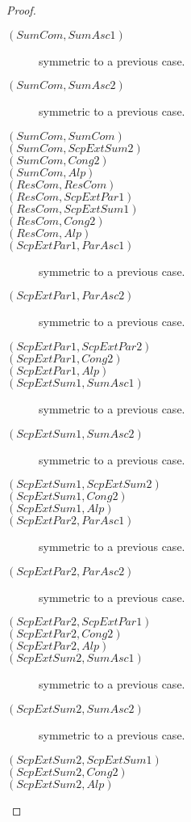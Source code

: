 \begin{lemma}
\begin{proof}
\begin{description}
      \item[$(SumCom, SumAsc1)$] symmetric to a previous case.
      \item[$(SumCom, SumAsc2)$] symmetric to a previous case.
      \item[$(SumCom, SumCom)$]
      \item[$(SumCom, ScpExtSum2)$]
      \item[$(SumCom, Cong2)$]
      \item[$(SumCom, Alp)$]

      \item[$(ResCom, ResCom)$]
      \item[$(ResCom, ScpExtPar1)$]
      \item[$(ResCom, ScpExtSum1)$]
      \item[$(ResCom, Cong2)$]
      \item[$(ResCom, Alp)$]

      \item[$(ScpExtPar1, ParAsc1)$] symmetric to a previous case.
      \item[$(ScpExtPar1, ParAsc2)$] symmetric to a previous case.
      \item[$(ScpExtPar1, ScpExtPar2)$] 
      \item[$(ScpExtPar1, Cong2)$]
      \item[$(ScpExtPar1, Alp)$]

      \item[$(ScpExtSum1, SumAsc1)$] symmetric to a previous case.
      \item[$(ScpExtSum1, SumAsc2)$] symmetric to a previous case.
      \item[$(ScpExtSum1, ScpExtSum2)$] 
      \item[$(ScpExtSum1, Cong2)$]
      \item[$(ScpExtSum1, Alp)$]

      \item[$(ScpExtPar2, ParAsc1)$] symmetric to a previous case.
      \item[$(ScpExtPar2, ParAsc2)$] symmetric to a previous case.
      \item[$(ScpExtPar2, ScpExtPar1)$] 
      \item[$(ScpExtPar2, Cong2)$]
      \item[$(ScpExtPar2, Alp)$]

      \item[$(ScpExtSum2, SumAsc1)$] symmetric to a previous case.
      \item[$(ScpExtSum2, SumAsc2)$] symmetric to a previous case.
      \item[$(ScpExtSum2, ScpExtSum1)$] 
      \item[$(ScpExtSum2, Cong2)$]
      \item[$(ScpExtSum2, Alp)$]


\end{description}
\end{proof}
\end{lemma}
